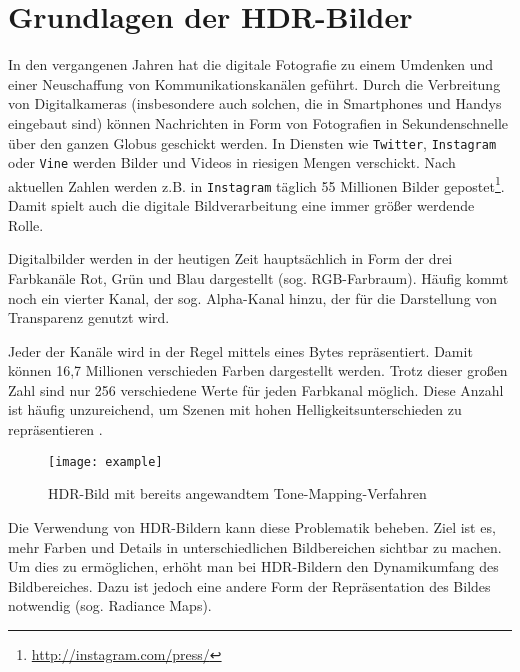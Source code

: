 
\chapter{Grundlagen der HDR-Bilder}
\label{chap:hdr}


In den vergangenen Jahren hat die digitale Fotografie zu einem Umdenken und einer Neuschaffung von Kommunikationskanälen geführt. 
Durch die Verbreitung von Digitalkameras (insbesondere auch solchen, die in Smartphones und Handys eingebaut sind) können Nachrichten in Form von Fotografien in Sekundenschnelle über den ganzen Globus geschickt werden. In Diensten wie \texttt{Twitter}, \texttt{Instagram} oder \texttt{Vine} werden Bilder und Videos in riesigen Mengen verschickt. Nach aktuellen Zahlen werden z.B. in \texttt{Instagram} täglich 55 Millionen Bilder gepostet\footnote{\url{http://instagram.com/press/}}. Damit spielt auch die digitale Bildverarbeitung eine immer größer werdende Rolle. 

Digitalbilder werden in der heutigen Zeit hauptsächlich in Form der drei Farbkanäle Rot, Grün und Blau dargestellt (sog. RGB-Farbraum). Häufig kommt noch ein vierter Kanal, der sog. Alpha-Kanal hinzu, der für die Darstellung von Transparenz genutzt wird. 

Jeder der Kanäle wird in der Regel mittels eines Bytes repräsentiert. Damit können 16,7 Millionen verschieden Farben dargestellt werden. Trotz dieser großen Zahl sind nur 256 verschiedene Werte für jeden Farbkanal möglich. Diese Anzahl ist häufig unzureichend, um Szenen mit hohen Helligkeitsunterschieden zu repräsentieren \cite[S.~1f]{Reinhard}.


\begin{figure}
  \begin{center}
    \texttt{[image: example]}
    \caption{HDR-Bild mit bereits angewandtem \gls{Tone-Mapping}-Verfahren \cite{tellone}}
    \label{fig:teezer}
  \end{center}
\end{figure}

Die Verwendung von \gls{HDR}-Bildern kann diese Problematik beheben. Ziel ist es, mehr Farben und Details in unterschiedlichen Bildbereichen sichtbar zu machen. Um dies zu ermöglichen, erhöht man bei \gls{HDR}-Bildern den \gls{Dynamikumfang} des Bildbereiches. Dazu ist jedoch eine andere Form der Repräsentation des Bildes notwendig (sog. \glspl{Radiance Map}).

